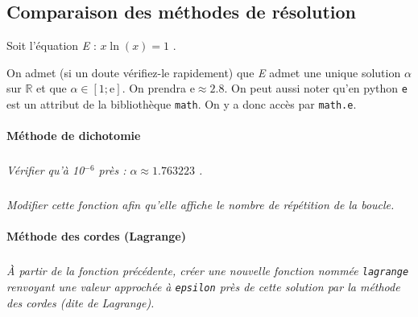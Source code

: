 \setcounter{exo}{0}
\vspace{2cm}
\begin{multicols}{2}

\subsection*{Comparaison des méthodes de résolution}


Soit l'équation \emph{E} : \quad $x\ln(x)=1$ .

On admet (si un doute vérifiez-le rapidement) que \emph{E} admet une unique solution $\alpha$ sur $\mathbb R$ et que
$\alpha\in[1;\text{e}]$. On prendra e$\approx2.8$. On peut aussi noter qu'en python \texttt{e} est un attribut de la bibliothèque \texttt{math}. On y a donc accès par \texttt{math.e}.



\paragraph*{Méthode de dichotomie}

%
%
\subparagraph{} \textit{Vérifier qu'à 10$^{-6}$ près : $\alpha\approx 1.763223$ .}
\subparagraph{} \textit{Modifier cette fonction afin qu'elle affiche le nombre de répétition de la boucle.}

%
%
%
%
%
%
%
%
%
%
%
%




\paragraph*{Méthode des cordes (Lagrange)}


\subparagraph{} \textit{À partir de la fonction précédente, créer une nouvelle fonction nommée \texttt{lagrange} renvoyant une valeur approchée à \texttt{epsilon} près de cette solution par la méthode des cordes (dite de Lagrange).}


\end{multicols}
